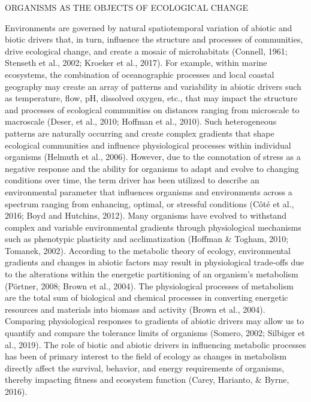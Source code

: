 \documentclass[
  11pt,
]{article}
\begin{document}
\begin{centering}
\begin{centering}
ORGANISMS AS THE OBJECTS OF ECOLOGICAL CHANGE
\end{centering}

Environments are governed by natural spatiotemporal variation of abiotic
and biotic drivers that, in turn, influence the structure and processes
of communities, drive ecological change, and create a mosaic of
microhabitats (Connell, 1961; Stenseth et al., 2002; Kroeker et al.,
2017). For example, within marine ecosystems, the combination of
oceanographic processes and local coastal geography may create an array
of patterns and variability in abiotic drivers such as temperature,
flow, pH, dissolved oxygen, etc., that may impact the structure and
processes of ecological communities on distances ranging from microscale
to macroscale (Deser, et al., 2010; Hoffman et al., 2010). Such
heterogeneous patterns are naturally occurring and create complex
gradients that shape ecological communities and influence physiological
processes within individual organisms (Helmuth et al., 2006). However,
due to the connotation of stress as a negative response and the ability
for organisms to adapt and evolve to changing conditions over time, the
term driver has been utilized to describe an environmental parameter
that influences organisms and environments across a spectrum ranging
from enhancing, optimal, or stressful conditions (Côté et al., 2016;
Boyd and Hutchins, 2012). Many organisms have evolved to withstand
complex and variable environmental gradients through physiological
mechanisms such as phenotypic plasticity and acclimatization (Hoffman \&
Togham, 2010; Tomanek, 2002). According to the metabolic theory of
ecology, environmental gradients and changes in abiotic factors may
result in physiological trade-offs due to the alterations within the
energetic partitioning of an organism's metabolism (Pörtner, 2008; Brown
et al., 2004). The physiological processes of metabolism are the total
sum of biological and chemical processes in converting energetic
resources and materials into biomass and activity (Brown et al., 2004).
Comparing physiological responses to gradients of abiotic drivers may
allow us to quantify and compare the tolerance limits of organisms
(Somero, 2002; Silbiger et al., 2019). The role of biotic and abiotic
drivers in influencing metabolic processes has been of primary interest
to the field of ecology as changes in metabolism directly affect the
survival, behavior, and energy requirements of organisms, thereby
impacting fitness and ecosystem function (Carey, Harianto, \& Byrne,
2016).


\end{centering}
\end{document}
